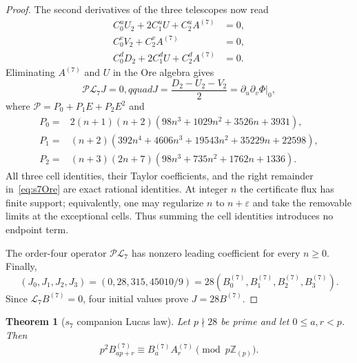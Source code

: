 \documentclass[11pt,reqno]{amsart}
\newtheorem{theorem}{Theorem}[section]
\theoremstyle{definition}
\theoremstyle{remark}
\newcommand{\Zp}{\mathbb Z_{(p)}}
\begin{document}
\begin{proof}
The second derivatives of the three telescopes now read
\begin{align*}
 C_0^uU_2+2C_1^uU+C_2^uA^{(7)}&=0,\\
 C_0^vV_2+C_2^vA^{(7)}&=0,\\
 C_0^dD_2+2C_1^dU+C_2^dA^{(7)}&=0.
\end{align*}
Eliminating $A^{(7)}$ and $U$ in the Ore algebra gives
\begin{equation}\label{eq:s7Ore}
 \mathcal P\mathcal L_7J=0,qquad
 J=\frac{D_2-U_2-V_2}{2}=\partial_u\partial_v\Phi|_0,
\end{equation}
where $\mathcal P=P_0+P_1E+P_2E^2$ and
\begin{align*}
 P_0={}&2(n+1)(n+2)(98n^3+1029n^2+3526n+3931),\\
 P_1={}&(n+2)(392n^4+4606n^3+19543n^2+35229n+22598),\\
 P_2={}&(n+3)(2n+7)(98n^3+735n^2+1762n+1336).
\end{align*}
All three cell identities, their Taylor coefficients, and the right remainder
in~\eqref{eq:s7Ore} are exact rational identities.  At integer $n$ the
certificate flux has finite support; equivalently, one may regularize
$n$ to $n+\varepsilon$ and take the removable limits at the exceptional
cells.  Thus summing the cell identities introduces no endpoint term.

The order-four operator $\mathcal P\mathcal L_7$ has nonzero leading
coefficient for every $n\geq0$.  Finally,
\[
 (J_0,J_1,J_2,J_3)=(0,28,315,45010/9)
 =28(B_0^{(7)},B_1^{(7)},B_2^{(7)},B_3^{(7)}).
\]
Since $\mathcal L_7B^{(7)}=0$, four initial values prove $J=28B^{(7)}$.
\end{proof}

\begin{theorem}[$s_7$ companion Lucas law]\label{thm:s7lucas}
Let $p\nmid28$ be prime and let $0\leq a,r<p$.  Then
\begin{equation}\label{eq:s7lucas}
 p^2B_{ap+r}^{(7)}\equiv B_a^{(7)}A_r^{(7)}\pmod {p\Zp}.
\end{equation}
\end{theorem}
\end{document}
